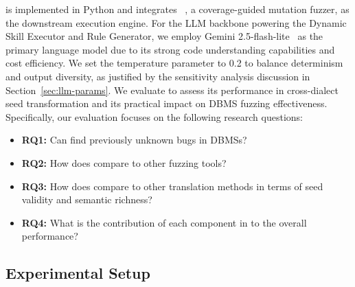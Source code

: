 \documentclass[sigconf,review,anonymous]{acmart}
\begin{document}
\tool{} is implemented in Python and integrates \griffin{}~\cite{fu2022griffin}, a coverage-guided mutation fuzzer, as the downstream execution engine. For the LLM backbone powering the Dynamic Skill Executor and Rule Generator, we employ Gemini 2.5-flash-lite~\cite{gemini-2.5-flash} as the primary language model due to its strong code understanding capabilities and cost efficiency. We set the temperature parameter to 0.2 to balance determinism and output diversity, as justified by the sensitivity analysis discussion in Section~\ref{sec:llm-params}.
We evaluate \tool{} to assess its performance in cross-dialect seed transformation and its practical impact on DBMS fuzzing effectiveness. Specifically, our evaluation focuses on the following research questions:
\begin{itemize}[leftmargin=*]
\item \textbf{RQ1:} Can \tool{} find previously unknown bugs in DBMSs?
\item \textbf{RQ2:} How does \tool{} compare to other fuzzing tools?
\item \textbf{RQ3:} How does \tool{} compare to other translation methods in terms of seed validity and semantic richness?
\item \textbf{RQ4:} What is the contribution of each component in \tool{} to the overall performance?
\end{itemize}

\subsection{Experimental Setup}
\label{sec:setup}

\end{document}

